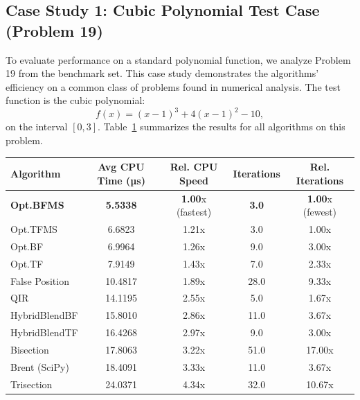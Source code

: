 \documentclass[amsmath, amssymb, aps]{revtex4-2}
\begin{document}
\subsection*{Case Study 1: Cubic Polynomial Test Case (Problem 19)}
To evaluate performance on a standard polynomial function, we analyze Problem 19 from the benchmark set. This case study demonstrates the algorithms' efficiency on a common class of problems found in numerical analysis. The test function is the cubic polynomial:
\[
f(x) = (x - 1)^3 + 4(x - 1)^2 - 10,
\]
on the interval $[0, 3]$. Table~\ref{tab:realworld1} summarizes the results for all algorithms on this problem.

\begin{table}[H]
\centering
{}
\label{tab:realworld1}
\begin{tabular}{lcccc}
\hline
Algorithm              & Avg CPU Time (µs) & Rel. CPU Speed          & Iterations & Rel. Iterations \\
\hline
\textbf{Opt.BFMS}      & \textbf{5.5338}   & \textbf{1.00}x (fastest) & \textbf{3.0}  & \textbf{1.00}x (fewest) \\
Opt.TFMS               & 6.6823            & 1.21x           & 3.0           & 1.00x \\
Opt.BF                 & 6.9964            & 1.26x           & 9.0           & 3.00x \\
Opt.TF                 & 7.9149            & 1.43x           & 7.0           & 2.33x \\
False Position         & 10.4817           & 1.89x           & 28.0          & 9.33x \\
QIR                    & 14.1195           & 2.55x           & 5.0           & 1.67x \\
HybridBlendBF          & 15.8010           & 2.86x           & 11.0          & 3.67x \\
HybridBlendTF          & 16.4268           & 2.97x           & 9.0           & 3.00x \\
Bisection              & 17.8063           & 3.22x           & 51.0          & 17.00x \\
Brent (SciPy)          & 18.4091           & 3.33x           & 11.0          & 3.67x \\
Trisection             & 24.0371           & 4.34x           & 32.0          & 10.67x \\
\hline
\end{tabular}
\end{table}
\end{document}
